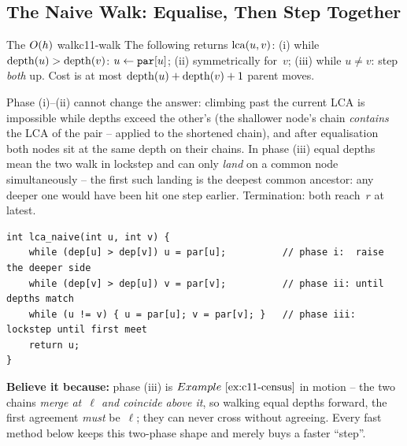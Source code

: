 \subsection{The Naive Walk: Equalise, Then Step Together}

\begin{proposition}{The $O(h)$ walk}{c11-walk}
The following returns \(\operatorname{lca}(u,v)\): (i) while
\(\operatorname{depth}(u) > \operatorname{depth}(v)\): \(u \leftarrow \texttt{par}[u]\); (ii)
symmetrically for~\(v\); (iii) while \(u \ne v\): step \emph{both} up.
Cost is at most \(\operatorname{depth}(u) + \operatorname{depth}(v) + 1\) parent moves.
\end{proposition}

\begin{proofbox}
Phase (i)--(ii) cannot change the answer: climbing past the current LCA
is impossible while depths exceed the other's (the shallower node's chain
\emph{contains} the LCA of the pair --  applied to the
shortened chain), and after equalisation both nodes sit at the same depth
on their chains.  In phase (iii) equal depths mean the two walk in
lockstep and can only \emph{land} on a common node simultaneously -- the
first such landing is the deepest common ancestor: any deeper one would
have been hit one step earlier.  Termination: both reach~\(r\) at latest.
\end{proofbox}

\begin{lstlisting}[caption={The walk in five lines -- the template 16.2 and 16.3 only change how far one ``step'' may jump}, label={lst:c11-naive}]
int lca_naive(int u, int v) {
    while (dep[u] > dep[v]) u = par[u];          // phase i:  raise the deeper side
    while (dep[v] > dep[u]) v = par[v];          // phase ii: until depths match
    while (u != v) { u = par[u]; v = par[v]; }   // phase iii: lockstep until first meet
    return u;
}
\end{lstlisting}

\noindent\textbf{Believe it because:} phase (iii) is
\(\exref{c11-census}\) in motion -- the two chains \emph{merge at~\(\ell\)
and coincide above it}, so walking equal depths forward, the first
agreement \emph{must} be~\(\ell\); they can never cross without agreeing.
Every fast method below keeps this two-phase shape and merely buys a
faster ``step''.

